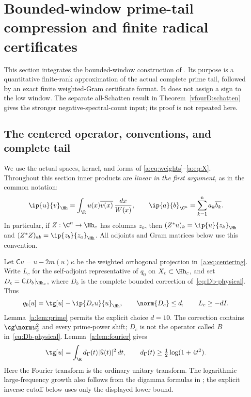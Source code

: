 \section{Bounded-window prime-tail compression and finite radical certificates}
\label{vfourB:sec}\label{vfourB:section}

This section integrates the bounded-window construction of
\cite{vfourLowWindow}. Its purpose is a quantitative finite-rank
approximation of the actual complete prime tail, followed by an exact
finite weighted-Gram certificate format. It does not assign a sign to the
low window. The separate all-Schatten result in
Theorem~\ref{vfourD:schatten} gives the stronger negative-spectral-count
input; its proof is not repeated here.

\subsection{The centered operator, conventions, and complete tail}
\label{vfourB:setting}

We use the actual spaces, kernel, and forms of
\eqref{a:eq:weights}--\eqref{a:eq:X}. Throughout this section inner products
are \emph{linear in the first argument}, as in the common notation:
\[
 \ip{u}{v}_{\Hh}=\int_{\R}u(x)\overline{v(x)}\,\frac{dx}{W(x)},
 \qquad \ip{a}{b}_{\C^n}=\sum_{k=1}^n a_k\overline{b_k}.
\]
In particular, if $Z:\C^n\to\Hh_c$ has columns $z_k$, then
$(Z^*u)_k=\ip{u}{z_k}_{\Hh}$ and
$(Z^*Z)_{ab}=\ip{z_b}{z_a}_{\Hh}$. All adjoints and Gram matrices below
use this convention.

Let $\mathsf C u=u-2m(u)\kappa$ be the weighted orthogonal projection
in~\eqref{a:eq:centering}. Write $L_c$ for the self-adjoint representative
of $q_0$ on $X_c\subset\Hh_c$, and set
$D_c=\mathsf C D_b|_{\Hh_c}$, where $D_b$ is the complete bounded
correction of~\eqref{eq:Db-physical}. Thus
\begin{equation}\label{vfourB:centered-form}
 q_0[u]=\tg[u]-\ip{D_cu}{u}_{\Hh},\qquad
 \norm{D_c}\le d,\qquad L_c\ge-dI.
\end{equation}
Lemma~\ref{a:lem:prime} permits the explicit choice $d=10$.
The correction contains $\cg\norm u_2^2$ and every prime-power shift;
$D_c$ is not the operator called $B$ in~\eqref{eq:Db-physical}.
Lemma~\ref{a:lem:fourier} gives
\begin{equation}\label{vfourB:gamma}
 \tg[u]=\int_{\R}d_\Gamma(t)|\widehat u(t)|^2\,dt,
 \qquad d_\Gamma(t)\ge\tfrac12\log(1+4t^2).
\end{equation}
Here the Fourier transform is the ordinary unitary transform.
The logarithmic large-frequency growth also follows from the digamma
formulas in \cite[Sections 5.9 and 5.11]{DLMF}; the explicit inverse cutoff
below uses only the displayed lower bound.

